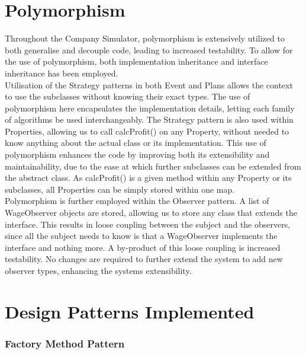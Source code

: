 \documentclass[]{article}
\begin{document}

\vspace*{0.8cm}
\section*{Polymorphism}

Throughout the Company Simulator, polymorphism is extensively utilized to both generalise and decouple code, leading to increased testability. To allow for the use of polymorphism, both implementation inheritance and interface inheritance has been employed. \\

Utilisation of the Strategy patterns in both Event and Plans allows the context to use the subclasses without knowing their exact types. The use of polymorphism here encapsulates the implementation details, letting each family of algorithms be used interchangeably. The Strategy pattern is also used within Properties, allowing us to call calcProfit() on any Property, without needed to know anything about the actual class or its implementation. This use of polymorphism enhances the code by improving both its extensibility and maintainability, due to the ease at which further subclasses can be extended from the abstract class. As calcProfit() is a given method within any Property or its subclasses, all Properties can be simply stored within one map.\\

Polymorphism is further employed within the Observer pattern. A list of WageObserver objects are stored, allowing us to store any class that extends the interface. This results in loose coupling between the subject and the observers, since all the subject needs to know is that a WageObserver implements the interface and nothing more. A by-product of this loose coupling is increased testability. No changes are required to further extend the system to add new observer types, enhancing the systems extensibility.


\section*{Design Patterns Implemented}

\subsubsection*{Factory Method Pattern}
\end{document}
